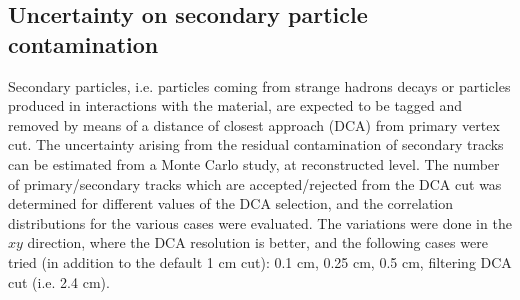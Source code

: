 \subsection{Uncertainty on secondary particle contamination}
Secondary particles, i.e. particles coming from strange hadrons decays or particles produced in interactions with the material, are expected to be tagged and removed by means of a distance of closest approach (DCA) from primary vertex cut. The uncertainty arising from the residual contamination of secondary tracks can be estimated from a Monte Carlo study, at reconstructed level. The number of primary/secondary tracks which are accepted/rejected from the DCA cut was determined for different values of the DCA selection, and the correlation distributions for the various cases were evaluated. The variations were done in the $xy$ direction, where the DCA resolution is better, and the following cases were tried (in addition to the default 1 cm cut): 0.1 cm, 0.25 cm, 0.5 cm, filtering DCA cut (i.e. 2.4 cm).

